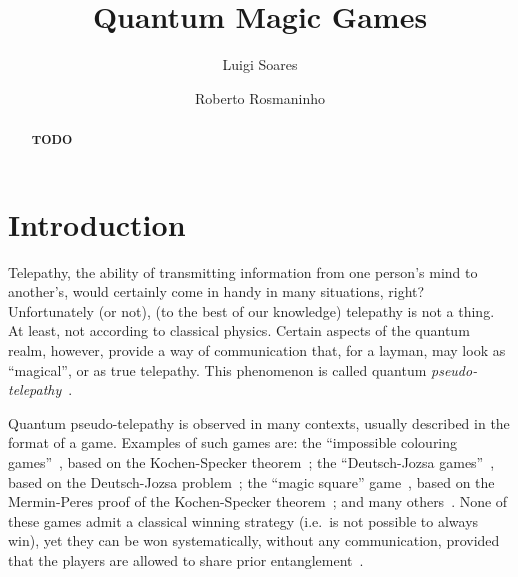 \documentclass{llncs}
\begin{document}
\title{Quantum Magic Games}

\author{Luigi Soares \and Roberto Rosmaninho}

\maketitle
\begin{abstract}
  \textbf{TODO}
\end{abstract}

\section{Introduction}
\label{sec:intro}

Telepathy, the ability of transmitting information from one
person's mind to another's, would certainly come in handy in
many situations, right? Unfortunately (or not), (to the best
of our knowledge) telepathy is not a thing. At least, not
according to classical physics. Certain aspects of the
quantum realm, however, provide a way of communication that,
for a layman, may look as ``magical'', or as true telepathy. This
phenomenon is called quantum
\emph{pseudo-telepathy}~\cite{brassard:2005}.


Quantum pseudo-telepathy is observed in many contexts, usually
described in the format of a game. Examples of such games are: the
``impossible colouring games''~\cite{cleve:2004}, based on the
Kochen-Specker theorem~\cite{kochen:1967};
the ``Deutsch-Jozsa games''~\cite{brassard:1999}, based on the Deutsch-Jozsa problem~\cite{deutsch:1992};
the ``magic square'' game~\cite{aravind:2002}, based on the Mermin-Peres proof of the
Kochen-Specker theorem~\cite{mermin:1990, peres:1990, mermin:1993, peres:1997}; and many
others~\cite{cleve:2004, brassard:2005}. None of these games admit a
classical winning strategy (i.e.\ is not possible to always win), yet
they can be won systematically, without any communication, provided
that the players are allowed to share prior entanglement~\cite{brassard:2005}.
\end{document}
